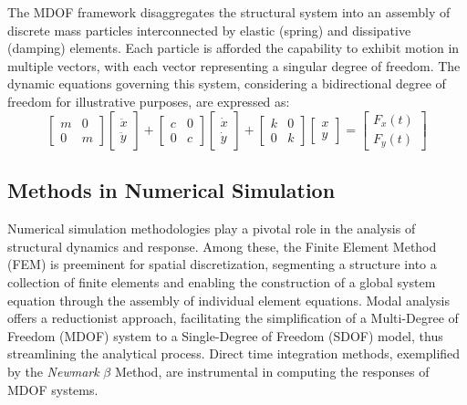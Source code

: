 \documentclass[conference]{IEEEtran}
\begin{document}
The MDOF framework disaggregates the structural system into an assembly of discrete mass particles interconnected by elastic (spring) and dissipative (damping) elements. Each particle is afforded the capability to exhibit motion in multiple vectors, with each vector representing a singular degree of freedom. The dynamic equations governing this system, considering a bidirectional degree of freedom for illustrative purposes, are expressed as:
\begin{equation}
\begin{bmatrix}
m & 0 \\
0 & m 
\end{bmatrix}
\begin{bmatrix}
\ddot{x} \\
\ddot{y}
\end{bmatrix}
+
\begin{bmatrix}
c & 0 \\
0 & c 
\end{bmatrix}
\begin{bmatrix}
\dot{x} \\
\dot{y}
\end{bmatrix}
+
\begin{bmatrix}
k & 0 \\
0 & k 
\end{bmatrix}
\begin{bmatrix}
x \\
y
\end{bmatrix}
=
\begin{bmatrix}
F_x(t) \\
F_y(t)
\end{bmatrix}
\end{equation}


\subsection{Methods in Numerical Simulation}

Numerical simulation methodologies play a pivotal role in the analysis of structural dynamics and response. Among these, the Finite Element Method (FEM) is preeminent for spatial discretization, segmenting a structure into a collection of finite elements and enabling the construction of a global system equation through the assembly of individual element equations. Modal analysis offers a reductionist approach, facilitating the simplification of a Multi-Degree of Freedom (MDOF) system to a Single-Degree of Freedom (SDOF) model, thus streamlining the analytical process. Direct time integration methods, exemplified by the \textit{Newmark} \( \beta \) Method, are instrumental in computing the responses of MDOF systems.
\end{document}
